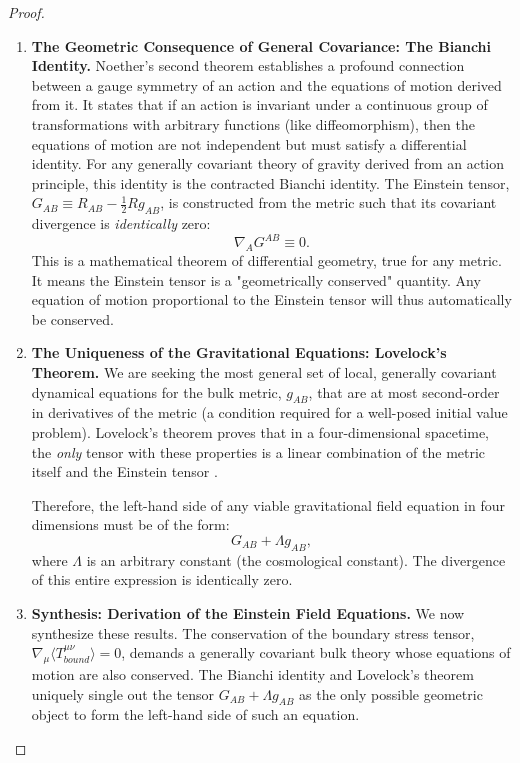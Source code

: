 \documentclass[11pt, letterpaper]{report}
\theoremstyle{plain} %
\theoremstyle{definition} %
\theoremstyle{remark} %
\begin{document}
\begin{proof}
\begin{enumerate}
    \item \textbf{The Geometric Consequence of General Covariance: The Bianchi Identity.}
    Noether's second theorem establishes a profound connection between a gauge symmetry of an action and the equations of motion derived from it. It states that if an action is invariant under a continuous group of transformations with arbitrary functions (like diffeomorphism), then the equations of motion are not independent but must satisfy a differential identity. For any generally covariant theory of gravity derived from an action principle, this identity is the contracted Bianchi identity. The Einstein tensor, $G_{AB} \equiv R_{AB} - \frac{1}{2} R g_{AB}$, is constructed from the metric such that its covariant divergence is \textit{identically} zero:
    \begin{equation}
        \nabla_A G^{AB} \equiv 0.
        \label{eq:bianchi_identity_revisited}
    \end{equation}
    This is a mathematical theorem of differential geometry, true for any metric. It means the Einstein tensor is a "geometrically conserved" quantity. Any equation of motion proportional to the Einstein tensor will thus automatically be conserved.

    \item \textbf{The Uniqueness of the Gravitational Equations: Lovelock's Theorem.}
    We are seeking the most general set of local, generally covariant dynamical equations for the bulk metric, $g_{AB}$, that are at most second-order in derivatives of the metric (a condition required for a well-posed initial value problem). Lovelock's theorem proves that in a four-dimensional spacetime, the \textit{only} tensor with these properties is a linear combination of the metric itself and the Einstein tensor \cite{Lovelock1971,Lovelock1972}.

    Therefore, the left-hand side of any viable gravitational field equation in four dimensions must be of the form:
    \begin{equation}
        G_{AB} + \Lambda g_{AB},
    \end{equation}
    where $\Lambda$ is an arbitrary constant (the cosmological constant). The divergence of this entire expression is identically zero.

    \item \textbf{Synthesis: Derivation of the Einstein Field Equations.}
    We now synthesize these results. The conservation of the boundary stress tensor, $\nabla_\mu \langle T^{\mu\nu}_{bound} \rangle = 0$, demands a generally covariant bulk theory whose equations of motion are also conserved. The Bianchi identity and Lovelock's theorem uniquely single out the tensor $G_{AB} + \Lambda g_{AB}$ as the only possible geometric object to form the left-hand side of such an equation.


\end{enumerate}
\end{proof}
\end{document}
